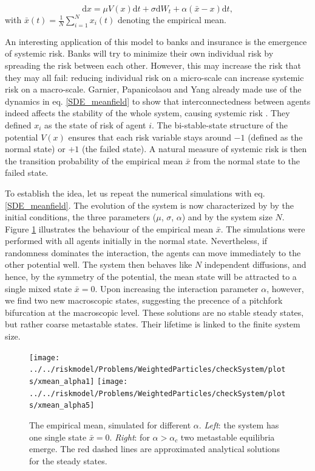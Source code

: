 \documentclass[]{article}
\newcommand{\dd}{\ensuremath{\mathrm{d}}}
\theoremstyle{definition}
\begin{document}
\begin{equation} 
\label{SDE_meanfield}
    \dd x = \mu V(x) \dd t + \sigma  \dd{W_t} + \alpha(\bar{x} -x) \dd t ,
\end{equation}
with  $\bar{x}(t) = \frac{1}{N} \sum_{i=1}^{N} x_i(t)$ denoting the empirical mean. 


An interesting application of this model to banks and insurance is the emergence of systemic risk.  Banks will try to minimize their own individual risk by spreading the risk between each other. However, this may increase the risk that they may all fail: reducing individual risk on a micro-scale can increase systemic risk on a macro-scale. 
Garnier, Papanicolaou and Yang already made use of the dynamics in eq. \eqref{SDE_meanfield}  to show that interconnectedness between agents indeed affects the stability of the whole system, causing systemic risk  \cite{Garnier}. They defined $x_i$  as the state of risk of agent $i$. The bi-stable-state structure of the potential $V(x)$ ensures that each risk variable stays around $-1$ (defined as the normal state) or $+1$ (the failed state).  A natural measure of systemic risk is then the transition probability of the empirical mean $\bar{x}$ from the normal state to the failed state. 
 

To establish the idea, let us repeat the numerical simulations with eq. \ref{SDE_meanfield}. The evolution of the system is now characterized by  by the initial conditions, the three parameters ($\mu$, $\sigma$, $\alpha$) and by the system size $N$. Figure \ref{fig:sysrisk}  illustrates the behaviour of the empirical mean $\bar{x}$. The simulations were performed with all agents initially in the normal state. Nevertheless, if randomness dominates the interaction, the agents can move immediately to the other potential well. The system then behaves like $N$ independent diffusions, and hence, by the symmetry of the potential, the mean state will be attracted to a single mixed state $\bar{x}=0$. Upon increasing the interaction parameter $\alpha$, however, we find two new macroscopic states, suggesting the precence of a pitchfork bifurcation at the macroscopic level. These solutions are no stable steady states, but rather coarse metastable states. Their lifetime is linked to the finite system size. 



\begin{center}
\begin{figure}
\texttt{[image: ../../riskmodel/Problems/WeightedParticles/checkSystem/plots/xmean\_alpha1]}
\texttt{[image: ../../riskmodel/Problems/WeightedParticles/checkSystem/plots/xmean\_alpha5]}

\caption{The empirical mean, simulated for different $\alpha$. \textit{Left}: the system has one single state $\bar{x}=0$. \textit{Right}: for $\alpha> \alpha_c$ two metastable equilibria emerge. 
 The red dashed lines are approximated  analytical solutions for the steady states. \label{fig:sysrisk}}
\end{figure}
\end{center}
\end{document}
